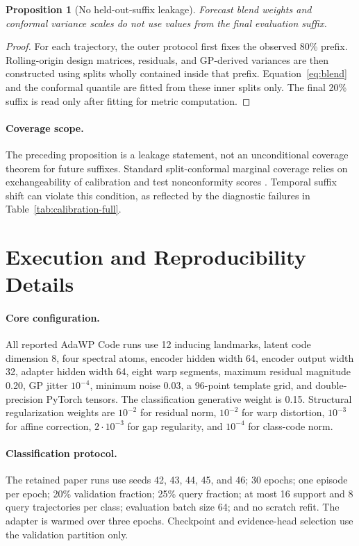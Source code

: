 \documentclass[11pt]{article}
\newcommand{\method}{AdaWP Code}
\newtheorem{proposition}{Proposition}
\begin{document}
\begin{proposition}[No held-out-suffix leakage]
Forecast blend weights and conformal variance scales do not use values from the final evaluation suffix.
\end{proposition}
\begin{proof}
For each trajectory, the outer protocol first fixes the observed 80\% prefix. Rolling-origin design matrices, residuals, and GP-derived variances are then constructed using splits wholly contained inside that prefix. Equation~\eqref{eq:blend} and the conformal quantile are fitted from these inner splits only. The final 20\% suffix is read only after fitting for metric computation.
\end{proof}

\paragraph{Coverage scope.}
The preceding proposition is a leakage statement, not an unconditional coverage theorem for future suffixes. Standard split-conformal marginal coverage relies on exchangeability of calibration and test nonconformity scores \citep{lei2018distribution}. Temporal suffix shift can violate this condition, as reflected by the diagnostic failures in Table~\ref{tab:calibration-full}.

\section{Execution and Reproducibility Details}
\label{app:execution}

\paragraph{Core configuration.}
All reported \method{} runs use 12 inducing landmarks, latent code dimension 8, four spectral atoms, encoder hidden width 64, encoder output width 32, adapter hidden width 64, eight warp segments, maximum residual magnitude 0.20, GP jitter $10^{-4}$, minimum noise 0.03, a 96-point template grid, and double-precision PyTorch tensors. The classification generative weight is 0.15. Structural regularization weights are $10^{-2}$ for residual norm, $10^{-2}$ for warp distortion, $10^{-3}$ for affine correction, $2\cdot10^{-3}$ for gap regularity, and $10^{-4}$ for class-code norm.

\paragraph{Classification protocol.}
The retained paper runs use seeds 42, 43, 44, 45, and 46; 30 epochs; one episode per epoch; 20\% validation fraction; 25\% query fraction; at most 16 support and 8 query trajectories per class; evaluation batch size 64; and no scratch refit. The adapter is warmed over three epochs. Checkpoint and evidence-head selection use the validation partition only.
\end{document}

